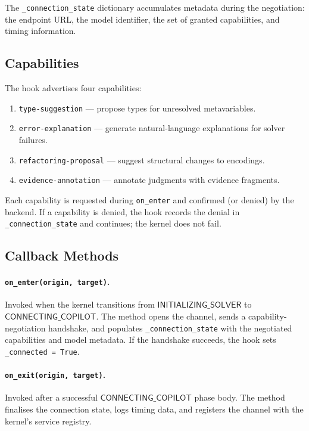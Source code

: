 \documentclass[11pt]{article}
\newcommand{\INITSOLVER}{\mathsf{INITIALIZING\_SOLVER}}
\newcommand{\CONNECTING}{\mathsf{CONNECTING\_COPILOT}}
\begin{document}
The \texttt{\_connection\_state} dictionary accumulates metadata
during the negotiation: the endpoint URL, the model identifier,
the set of granted capabilities, and timing information.

\subsection{Capabilities}

The hook advertises four capabilities:
\begin{enumerate}
  \item \texttt{type-suggestion} — propose types for unresolved
        metavariables.
  \item \texttt{error-explanation} — generate natural-language
        explanations for solver failures.
  \item \texttt{refactoring-proposal} — suggest structural changes
        to encodings.
  \item \texttt{evidence-annotation} — annotate judgments with
        evidence fragments.
\end{enumerate}

Each capability is requested during \texttt{on\_enter} and
confirmed (or denied) by the backend.  If a capability is denied,
the hook records the denial in \texttt{\_connection\_state} and
continues; the kernel does not fail.

\subsection{Callback Methods}

\paragraph{\texttt{on\_enter(origin, target)}.}
Invoked when the kernel transitions from $\INITSOLVER$ to
$\CONNECTING$.  The method opens the channel, sends a
capability-negotiation handshake, and populates
\texttt{\_connection\_state} with the negotiated capabilities and
model metadata.  If the handshake succeeds, the hook sets
\texttt{\_connected = True}.

\paragraph{\texttt{on\_exit(origin, target)}.}
Invoked after a successful $\CONNECTING$ phase body.  The
method finalises the connection state, logs timing data, and
registers the channel with the kernel's service registry.
\end{document}

